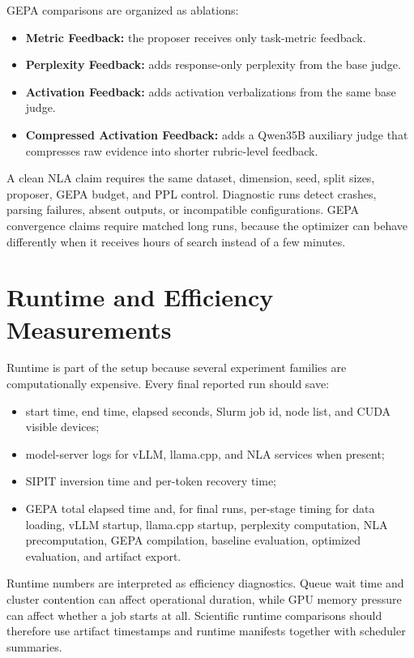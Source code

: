 \documentclass[12pt,a4paper,twoside,openright]{book}
\begin{document}
GEPA comparisons are organized as ablations:
\begin{itemize}
    \item \textbf{Metric Feedback:} the proposer receives only task-metric feedback.
    \item \textbf{Perplexity Feedback:} adds response-only perplexity from the base judge.
    \item \textbf{Activation Feedback:} adds activation verbalizations from the same base
    judge.
    \item \textbf{Compressed Activation Feedback:} adds a Qwen35B auxiliary judge that
    compresses raw evidence into shorter rubric-level feedback.
\end{itemize}

A clean NLA claim requires the same dataset, dimension, seed, split sizes,
proposer, GEPA budget, and PPL control. Diagnostic runs detect crashes, parsing
failures, absent outputs, or incompatible configurations. GEPA convergence
claims require matched long runs, because the optimizer can behave differently
when it receives hours of search instead of a few minutes.

\section{Runtime and Efficiency Measurements}
\label{sec:setup-runtime}

Runtime is part of the setup because several experiment families are computationally
expensive. Every final reported run should save:
\begin{itemize}
    \item start time, end time, elapsed seconds, Slurm job id, node list, and
    CUDA visible devices;
    \item model-server logs for vLLM, llama.cpp, and NLA services when present;
    \item SIPIT inversion time and per-token recovery time;
    \item GEPA total elapsed time and, for final runs, per-stage timing for data
    loading, vLLM startup, llama.cpp startup, perplexity computation, NLA
    precomputation, GEPA compilation, baseline evaluation, optimized
    evaluation, and artifact export.
\end{itemize}

Runtime numbers are interpreted as efficiency diagnostics. Queue wait time and
cluster contention can affect operational duration, while GPU memory pressure
can affect whether a job starts at all. Scientific runtime comparisons should
therefore use artifact timestamps and runtime manifests together with scheduler
summaries.
\end{document}
